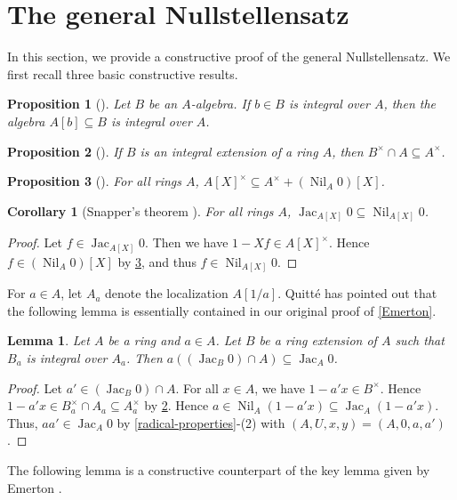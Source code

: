 \documentclass[11pt]{article}
\newtheorem{lemma}{Lemma}[section]
\newtheorem{corollary}{Corollary}[section]
\newtheorem{proposition}{Proposition}[section]
\theoremstyle{definition}
\DeclareMathOperator{\Nil}{Nil}
\DeclareMathOperator{\Jac}{Jac}
\begin{document}
\section{The general Nullstellensatz}
In this section, we provide a constructive proof of the general Nullstellensatz.
We first recall three basic constructive results.
\begin{proposition}[{\cite[Corollary VI-1.3]{MRR88}}]\label{integrality-monogenic-algebra}
    Let $B$ be an $A$-algebra. If $b\in B$ is integral over $A$, then the algebra $A[b]\subseteq B$ is integral over $A$.
\end{proposition}
\begin{proposition}[{\cite[Theorem IX-1.7]{LQ15}}]\label{invertibility-integral-extension}
    If $B$ is an integral extension of a ring $A$, then $B^\times\cap A\subseteq A^\times$.
\end{proposition}
\begin{proposition}[{\cite[Lemma II-2.6]{LQ15}}]\label{invertible-polynomial}
    For all rings $A$, $A[X]^\times\subseteq A^\times+(\Nil_A0)[X]$.
\end{proposition}
\begin{corollary}[Snapper's theorem {\cite[Corollary 8.1]{Sna50}}]\label{polynomial-jac-nil}
    For all rings $A$, $\Jac_{A[X]}0\subseteq\Nil_{A[X]}0$.
\end{corollary}
\begin{proof}
    Let $f\in\Jac_{A[X]}0$. Then we have $1-Xf\in A[X]^{\times}$. Hence $f\in(\Nil_A0)[X]$ by \cref{invertible-polynomial}, and thus $f\in\Nil_{A[X]}0$.
\end{proof}
For $a\in A$, let $A_a$ denote the localization $A[1/a]$. Quitté \cite{Qui24} has pointed out that the following lemma is essentially contained in our original proof of \cref{Emerton}.
\begin{lemma}\label{quitte-lemma}
    Let $A$ be a ring and $a\in A$. Let $B$ be a ring extension of $A$ such that $B_a$ is integral over $A_a$. Then $a((\Jac_B0)\cap A)\subseteq\Jac_A0$.
\end{lemma}
\begin{proof}
    Let $a'\in(\Jac_B0)\cap A$. For all $x\in A$, we have $1-a'x\in B^\times$. Hence $1-a'x\in B_a^\times\cap A_a\subseteq A_a^\times$ by \cref{invertibility-integral-extension}.
    Hence $a\in\Nil_A(1-a'x)\subseteq\Jac_A(1-a'x)$. Thus, $aa'\in\Jac_A0$ by \cref{radical-properties}-(2) with $(A,U,x,y)=(A,0,a,a')$.
\end{proof}
The following lemma is a constructive counterpart of the key lemma given by Emerton \cite[Lemma 6]{Eme}.
\end{document}
